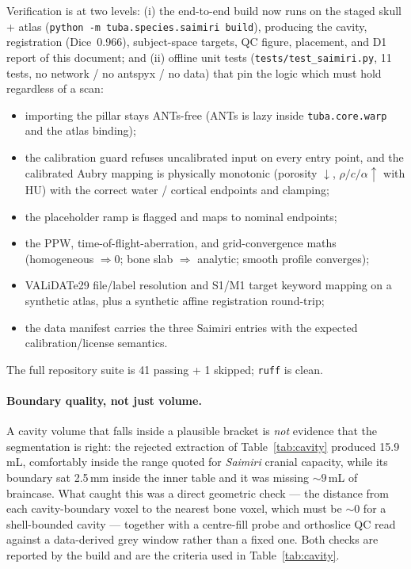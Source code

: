 \documentclass{compactarticle}
\begin{document}
Verification is at two levels: (i) the end-to-end build now runs on the
staged skull + atlas (\texttt{python -m tuba.species.saimiri build}),
producing the cavity, registration (Dice~0.966), subject-space targets,
QC figure, placement, and D1 report of this document; and (ii) offline
unit tests (\texttt{tests/test\_saimiri.py}, 11 tests, no network /
no antspyx / no data) that pin the logic which must hold regardless of a
scan:
\begin{itemize}[leftmargin=*]
\setlength\itemsep{0pt}
  \item importing the pillar stays ANTs-free (ANTs is lazy inside
        \texttt{tuba.core.warp} and the atlas binding);
  \item the calibration guard refuses uncalibrated input on every
        entry point, and the calibrated Aubry mapping is physically
        monotonic (porosity $\downarrow$, $\rho/c/\alpha \uparrow$ with
        HU) with the correct water / cortical endpoints and clamping;
  \item the placeholder ramp is flagged and maps to nominal endpoints;
  \item the PPW, time-of-flight-aberration, and grid-convergence maths
        (homogeneous $\Rightarrow 0$; bone slab $\Rightarrow$ analytic;
        smooth profile converges);
  \item VALiDATe29 file/label resolution and S1/M1 target keyword
        mapping on a synthetic atlas, plus a synthetic affine
        registration round-trip;
  \item the data manifest carries the three Saimiri entries with the
        expected calibration/license semantics.
\end{itemize}
The full repository suite is 41 passing + 1 skipped; \texttt{ruff} is
clean.

\paragraph{Boundary quality, not just volume.}
A cavity volume that falls inside a plausible bracket is \emph{not}
evidence that the segmentation is right: the rejected extraction of
Table~\ref{tab:cavity} produced 15.9\,mL, comfortably inside the range
quoted for \emph{Saimiri} cranial capacity, while its boundary sat
2.5\,mm inside the inner table and it was missing ${\sim}9$\,mL of
braincase. What caught this was a direct geometric check --- the
distance from each cavity-boundary voxel to the nearest bone voxel,
which must be ${\sim}0$ for a shell-bounded cavity --- together with a
centre-fill probe and orthoslice QC read against a data-derived grey
window rather than a fixed one. Both checks are reported by the build
and are the criteria used in Table~\ref{tab:cavity}.
\end{document}
